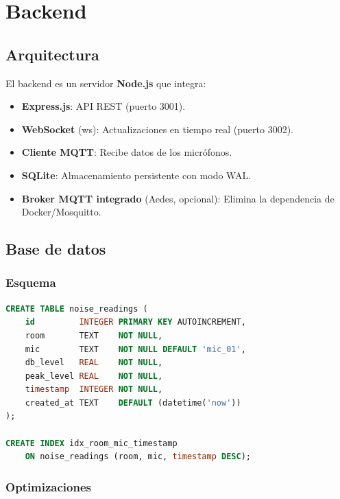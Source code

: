 \documentclass[12pt,a4paper]{report}
\begin{document}
\chapter{Backend}

\section{Arquitectura}

El backend es un servidor \textbf{Node.js} que integra:

\begin{itemize}
    \item \textbf{Express.js}: API REST (puerto 3001).
    \item \textbf{WebSocket} (ws): Actualizaciones en tiempo real (puerto 3002).
    \item \textbf{Cliente MQTT}: Recibe datos de los micr\'ofonos.
    \item \textbf{SQLite}: Almacenamiento persistente con modo WAL.
    \item \textbf{Broker MQTT integrado} (Aedes, opcional): Elimina la dependencia de Docker/Mosquitto.
\end{itemize}

\section{Base de datos}

\subsection{Esquema}

\begin{lstlisting}[language=SQL, caption={Esquema de la base de datos SQLite}]
CREATE TABLE noise_readings (
    id         INTEGER PRIMARY KEY AUTOINCREMENT,
    room       TEXT    NOT NULL,
    mic        TEXT    NOT NULL DEFAULT 'mic_01',
    db_level   REAL    NOT NULL,
    peak_level REAL    NOT NULL,
    timestamp  INTEGER NOT NULL,
    created_at TEXT    DEFAULT (datetime('now'))
);

CREATE INDEX idx_room_mic_timestamp
    ON noise_readings (room, mic, timestamp DESC);
\end{lstlisting}

\subsection{Optimizaciones}
\end{document}
